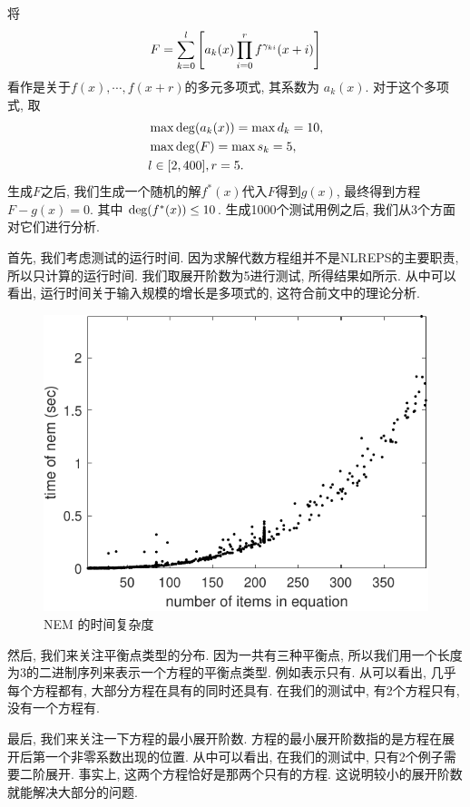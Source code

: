将 
\begin{equation}
    F=\sum_{k=0}^l{\left[a_k(x)\prod_{i=0}^r{f^{\gamma_{ki}}(x+i)}\right]}
\end{equation}
看作是关于$f(x),\cdots,f(x+r)$的多元多项式, 其系数为 $a_k(x)$. 对于这个多项式, 取
\begin{equation}
\begin{split}
&\max{\rm deg}(a_k(x))=\max d_k=10,\\ 
&\max{\rm deg}(F)=\max s_k=5, \\
&l\in [2,400], r=5.
\end{split}
\end{equation}
生成$F$之后, 我们生成一个随机的解$f^*(x)$代入$F$得到$g(x)$, 最终得到方程$F-g(x)=0$. 其中 ${\rm deg}(f^*(x))\le 10$. 生成1000个测试用例之后, 我们从3个方面对它们进行分析. 

首先, 我们考虑测试的运行时间. 因为求解代数方程组并不是NLREPS的主要职责, 所以只计算的运行时间. 我们取展开阶数为5进行测试, 所得结果如所示. 从中可以看出, 运行时间关于输入规模的增长是多项式的, 这符合前文中的理论分析. 
\begin{figure}[htbp]
\centering
\includegraphics[width=.5\textwidth]{fig/t-nem.pdf}
\caption{NEM 的时间复杂度}
\label{t-nem}
\end{figure}

然后, 我们来关注平衡点类型的分布. 因为一共有三种平衡点, 所以我们用一个长度为3的二进制序列来表示一个方程的平衡点类型. 例如表示只有\BPone{}. 从可以看出, 几乎每个方程都有\BPone{}, 大部分方程在具有\BPone{}的同时还具有\BPthree{}. 在我们的测试中, 有2个方程只有\BPthree{}, 没有一个方程有\BPtwo{}.


最后, 我们来关注一下方程的最小展开阶数. 方程的最小展开阶数指的是方程在展开后第一个非零系数出现的位置. 从中可以看出, 在我们的测试中, 只有2个例子需要二阶展开. 事实上, 这两个方程恰好是那两个只有\BPthree{}的方程. 这说明较小的展开阶数就能解决大部分的问题. 

